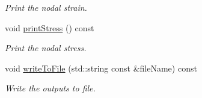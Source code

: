 \begin{DoxyCompactItemize}
\begin{DoxyCompactList}\small\item\em Print the nodal strain. \end{DoxyCompactList}\item 
\mbox{\label{class_analysis_a81a4488de8e18d1c067c94a9edd2ac61}} 
void \mbox{\hyperlink{class_analysis_a81a4488de8e18d1c067c94a9edd2ac61}{print\+Stress}} () const
\begin{DoxyCompactList}\small\item\em Print the nodal stress. \end{DoxyCompactList}\item 
\mbox{\label{class_analysis_a0c17471cdbed978e4c4d62718e7b1578}} 
void \mbox{\hyperlink{class_analysis_a0c17471cdbed978e4c4d62718e7b1578}{write\+To\+File}} (std\+::string const \&file\+Name) const
\begin{DoxyCompactList}\small\item\em Write the outputs to file. \end{DoxyCompactList}\end{DoxyCompactItemize}
